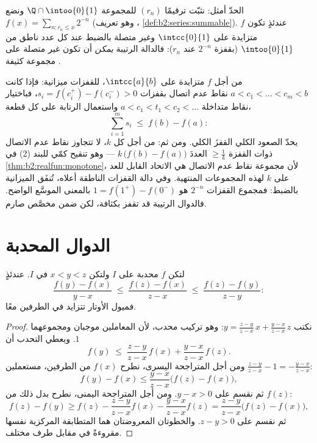 \begin{example}
الحدّ أمثل: نثبّت ترقيمًا $(r_n)$ للمجموعة $\Q \cap
\intoo{0}{1}$ ونضع $f(x) = \sum_{n : r_n \leq x} 2^{-n}$
(وهو تعريف ،
\cref{def:b2:series:summable}). عندئذٍ تكون $f$ متزايدة على
$\intcc{0}{1}$ وغير متصلة بالضبط عند كل عدد ناطق من
$\intoo{0}{1}$ (بقفزة $2^{-n}$ عند $r_n$): فالدالة الرتيبة
\emph{يمكن} أن تكون غير متصلة على مجموعة كثيفة .
\end{example}

\begin{example}\label{ex:b2:realfun:jumpbudget}
من أجل $f$ متزايدة على $\intcc{a}{b}$، للقفزات ميزانية:
فإذا كانت $a < c_1 < \dots < c_m < b$ نقاط عدم اتصال بقفزات
$s_i = f(c_i^+) - f(c_i^-) > 0$، فباختيار
نقاط متداخلة $a < c_1 < t_1 < c_2 < \dots$ واستعمال الرتابة على
كل قطعة،
\[
\sum_{i=1}^{m} s_i \;\leq\; f(b) - f(a) :
\]
يحدّ الصعود الكلي القفزَ الكلي. ومن ثم: من أجل
كل $k$، لا تتجاوز نقاط عدم الاتصال ذوات القفزة $\geq \frac1k$ العددَ $k\,\bigl(f(b) - f(a)\bigr)$ --- وهو تنقيح كمّي
للبند (2) في \cref{thm:b2:realfun:monotone}، لأن مجموعة نقاط عدم الاتصال
هي الاتحاد القابل للعد على $k$ لهذه المجموعات المنتهية. وفي
دالة القفزات الناطقة أعلاه، تُنفَق الميزانية بالضبط:
فمجموع القفزات $2^{-n}$ هو $1 = f(1^+) - f(0^-)$ بالمعنى الموسَّع
الواضح. فالدوال الرتيبة قد تقفز بكثافة، لكن ضمن
مخصَّص صارم.
\end{example}

\section{الدوال المحدبة}

\begin{lemma}\label{lem:b2:realfun:slopes}
لتكن $f$ محدبة على $I$ ولتكن $x < y < z$ في $I$. عندئذٍ
\[
\frac{f(y) - f(x)}{y - x}
\;\leq\; \frac{f(z) - f(x)}{z - x}
\;\leq\; \frac{f(z) - f(y)}{z - y} :
\]
فميول الأوتار تتزايد في الطرفين معًا.
\end{lemma}

\begin{proof}
نكتب $y = \frac{z - y}{z - x}\,x + \frac{y - x}{z - x}\,z$: وهو
تركيب محدب، لأن المعاملين موجبان ومجموعهما
$1$. ويعطي التحدب أن
\[
f(y) \;\leq\; \frac{z-y}{z-x}\,f(x) + \frac{y-x}{z-x}\,f(z).
\]
ومن أجل المتراجحة اليسرى، نطرح $f(x)$ من الطرفين، مستعملين
$\frac{z-y}{z-x} - 1 = -\frac{y-x}{z-x}$:
\[
f(y) - f(x) \leq \frac{y - x}{z - x}\bigl(f(z) - f(x)\bigr),
\]
ثم نقسم على $y - x > 0$. ومن أجل المتراجحة اليمنى، نطرح
بدل ذلك من $f(z)$:
\[
f(z) - f(y) \geq f(z) - \frac{z-y}{z-x}f(x) -
\frac{y-x}{z-x}f(z)
= \frac{z - y}{z - x}\bigl(f(z) - f(x)\bigr),
\]
ثم نقسم على $z - y > 0$. والخطوتان المعروضتان هما المتطابقة
المركزية نفسها مقروءةً في مقابل طرف مختلف.
\end{proof}

